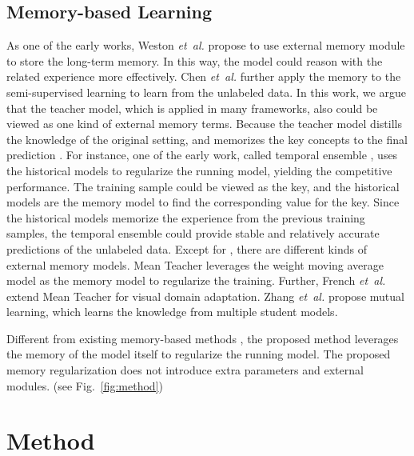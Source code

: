 \documentclass{article}
\def\etal{\emph{et~al.}}
\begin{document}
\subsection{Memory-based Learning}
As one of the early works, Weston \etal \cite{weston2014memory} propose to use external memory module to store the long-term memory. In this way, the model could reason with the related experience more effectively. 
Chen \etal \cite{chen2018semi} further apply the memory to the semi-supervised learning to learn from the unlabeled data. In this work, we argue that the teacher model, which is applied in many frameworks, also could be viewed as one kind of external memory terms. Because the teacher model distills the knowledge of the original setting, and memorizes the key concepts to the final prediction \cite{hinton2015distilling}. For instance, one of the early work, called temporal ensemble \cite{laine2016temporal}, uses the historical models to regularize the running model, yielding the competitive performance. The training sample could be viewed as the key, and the historical models are the memory model to find the corresponding value for the key. Since the historical models memorize the experience from the previous training samples, the temporal ensemble could provide stable and relatively accurate predictions of the unlabeled data. Except for \cite{laine2016temporal}, there are different kinds of external memory models. 
Mean Teacher \cite{tarvainen2017mean} leverages the weight moving average model as the memory model to regularize the training. Further, French \etal \cite{french2017self} extend Mean Teacher for visual domain adaptation. Zhang \etal \cite{zhang2018deep} propose mutual learning, which learns the knowledge from multiple student models. 

Different from existing memory-based methods \cite{chen2018semi,tarvainen2017mean,zhang2018deep}, the proposed method leverages the memory of the model itself to regularize the running model. The proposed memory regularization does not introduce extra parameters and external modules. (see Fig.~\ref{fig:method})

\section{Method}
\end{document}
